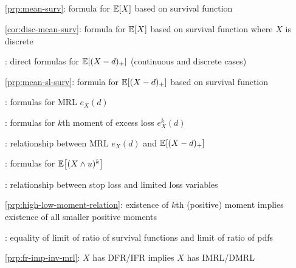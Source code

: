 \subsection*{}
\item \cref{prp:mean-surv}: formula for \(\mathbb{E}\qty[X]\) based on survival function
\item \cref{cor:disc-mean-surv}: formula for \(\mathbb{E}\qty[X]\) based on survival function where \(X\) is discrete
\item {}: direct formulas for \(\mathbb{E}\qty[(X-d)_{+}]\) (continuous and discrete cases)
\item \cref{prp:mean-sl-surv}: formula for \(\mathbb{E}\qty[(X-d)_{+}]\) based on survival function
\item {}: formulas for MRL \(e_X(d)\)
\item {}: formulas for \(k\)th moment of excess loss \(e_X^k(d)\)
\item {}: relationship between MRL \(e_X(d)\) and \(\mathbb{E}\qty[(X-d)_{+}]\)
\item {}: formulas for \(\mathbb{E}\qty[(X\wedge u)^{k}]\)
\item {}: relationship between stop loss and limited loss variables
\item \cref{prp:high-low-moment-relation}: existence of \(k\)th (positive) moment implies existence of all smaller positive moments
\item {}: equality of limit of ratio of survival functions and limit of ratio of pdfs
\item \cref{prp:fr-imp-inv-mrl}: \(X\) has DFR/IFR implies \(X\) has IMRL/DMRL
